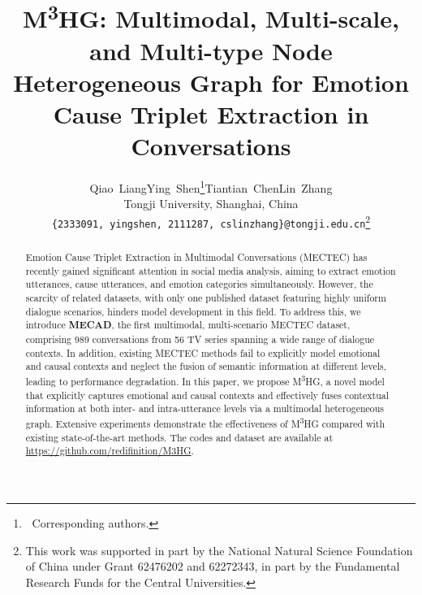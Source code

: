 \documentclass[11pt]{article}
\title{M\textsuperscript{3}HG: Multimodal, Multi-scale, and Multi-type Node Heterogeneous Graph for Emotion Cause Triplet Extraction in Conversations}
\author{
    Qiao~Liang\quad Ying~Shen\thanks{$\ $  Corresponding authors.}\quad Tiantian~Chen\quad Lin~Zhang \\
    Tongji University, Shanghai, China\\
    \texttt{\{2333091, yingshen, 2111287, cslinzhang\}@tongji.edu.cn}\thanks{\noindent 
This work was supported in part by the National Natural Science Foundation of China under Grant 62476202 and 62272343, in part by the Fundamental Research Funds for the Central Universities.}
}
\begin{document}
\maketitle

\begin{abstract}
Emotion Cause Triplet Extraction in Multimodal Conversations (MECTEC) has recently gained significant attention in social media analysis, aiming to extract emotion utterances, cause utterances, and emotion categories simultaneously.
However, the scarcity of related datasets, with only one published dataset featuring highly uniform dialogue scenarios, hinders model development in this field.
To address this, we introduce \textbf{MECAD}, the first multimodal, multi-scenario MECTEC dataset, comprising 989 conversations from 56 TV series spanning a wide range of dialogue contexts. 
In addition, existing MECTEC methods fail to explicitly model emotional and causal contexts and neglect the fusion of semantic information at different levels, leading to performance degradation.
In this paper, we propose M\textsuperscript{3}HG, a novel model that explicitly captures emotional and causal contexts and effectively fuses contextual information at both inter- and intra-utterance levels via a multimodal heterogeneous graph.
Extensive experiments demonstrate the effectiveness of M\textsuperscript{3}HG compared with existing state-of-the-art methods.
The codes and dataset are available at  \url{https://github.com/redifinition/M3HG}.
\end{abstract}
\end{document}
